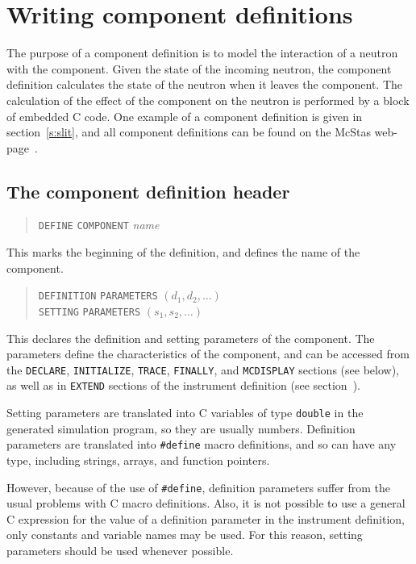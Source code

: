 {\section{Writing component definitions}
\label{s:compdefs}

The purpose of a component definition is to model the interaction of a
neutron with the component. Given the state of the incoming neutron, the
component definition calculates the state of the neutron when it leaves
the component.  The calculation of the effect of the component on the
neutron is performed by a block of embedded C code. 
One example of a component definition is given in section~\ref{s:slit}, and all
component definitions can be found on the McStas web-page~\cite{mcstas_webpage}.



\subsection{The component definition header}
\label{s:comp-header}

\begin{quote}
  \texttt{DEFINE} \texttt{COMPONENT} \textit{name}
\end{quote}
This marks the beginning of the definition, and defines the name of the
component.
\begin{quote}
  \texttt{DEFINITION} \texttt{PARAMETERS} $(d_1, d_2, \ldots)$ \\
  \texttt{SETTING} \texttt{PARAMETERS} $(s_1, s_2, \ldots)$
\end{quote}
This declares the definition and setting parameters of the component.
The parameters define the characteristics of the component, and can be
accessed from the \verb+DECLARE+, \verb+INITIALIZE+, \verb+TRACE+,
\verb+FINALLY+, and \verb+MCDISPLAY+ sections (see below), as well as in \verb+EXTEND+ sections of the instrument definition (see section~\label{s:instrdefs}).

Setting parameters are translated into C variables of type
\verb+double+ in the generated simulation program, so they are usually
numbers. Definition parameters are translated into \verb+#define+ macro
definitions, and so can have any type, including strings, arrays, and
function pointers.

However, because of the use of \verb+#define+, definition parameters
suffer from the usual problems with C macro definitions. Also, it is not
possible to use a general C expression for the value of a definition
parameter in the instrument definition, only constants and variable
names may be used. For this reason, setting parameters should be used
whenever possible.

}
